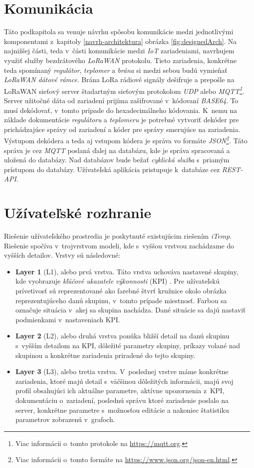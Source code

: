 \section{Komunikácia}\label{navrh-komunikacia}
Táto podkapitola sa venuje návrhu spôsobu komunikácie medzi jednotlivými komponentami z~kapitoly \ref{navrh-architektura} obrázka \ref{fig:designedArch}. Na najnižšej části, teda v~části komunikácie medzi \emph{IoT} zariadeniami, navrhujem využiť služby bezdrátového \emph{LoRaWAN} protokolu. 
Tieto zariadenia, konkrétne teda spomínaný \emph{regulátor}, \emph{teplomer} a \emph{brána} si medzi sebou budú vymieňať \emph{LoRaWAN dátové rámce}. Brána LoRa rádiové signály dešifruje a prepošle na LoRaWAN sieťový server štadartným sieťovým protokolom \emph{UDP} alebo \emph{MQTT\footnote{Viac informácii o~tomto protokole na \url{https://mqtt.org}.}}. 
Server užitočné dáta od zariadení prijíma zašifrované v~kódovaní \emph{BASE64}. 
To musí dekódovať, v~tomto prípade do hexadecimálneho kódovania. K~nemu na základe dokumentácie \emph{regulátoru} a \emph{teplomeru} je potrebné vytvoriť dekóder pre prichádzajúce správy od zariadení a kóder pre správy smerujúce na zariadenia. 
Výstupom dekódera a teda aj vstupom kódera je správa vo formáte \emph{JSON\footnote{Viac informácii o~tomto formáte na \url{https://www.json.org/json-en.html}.}.}
Táto správa je cez \emph{MQTT} poslaná ďalej na databázu, kde je správa spracovaná a uložená do databázy. 
Nad databázov bude bežať \emph{cyklická služba} s~priamým prístupom do databázy. Užívateľská aplikácia pristupuje k~databáze cez \emph{REST-API}.

\section{Užívateľské rozhranie}
Riešenie užívateľského prostredia je poskytnuté existujúcim riešením \emph{iTemp}.
Riešenie spočíva v~trojvrstvom modeli, kde s~vyššou vrstvou zachádzame do vyšších detailov. Vrstvy sú následovné:
\begin{itemize}
    \item \textbf{Layer 1} (L1), alebo prvá vrstva. Táto vrstva uchováva nastavené skupiny, kde vyobrazuje \textit{kľúčové ukazatele výkonnosti} (KPI) \cite{eckerson2010performance}. Pre užívateľskú prívetivosť sú reprezentované ako farebné štvrť kružnice okolo obrázka reprezentujúceho danú skupinu, v~tomto prípade miestnosť. Farbou sa označuje situácia v~akej sa skupina nachádza. Dané situácie sa dajú nastaviť podmienkami v~nastaveniach KPI.
    \item \textbf{Layer 2} (L2), alebo druhá vrstva ponúka bližší detail na danú skupinu s~vyšším detailom na KPI, dôležité parametry skupiny, príkazy volané nad skupinou a konkrétne zariadenia priradené do tejto skupiny.
    \item \textbf{Layer 3} (L3), alebo tretia vrstva. V~poslednej vrstve máme konkrétne zariadenia, ktoré majú detail s~väčšinou dôležitých informácii, majú svoj profil obsahujúci ich aktuálne parametre, aktívne upozornenia z~KPI, dokumentáciu o~zariadení, poslednú správu ktoré zariadenie poslalo na server, konkrétne parametre s~možnosťou editácie a nakoniec štatistiku parametrov zobrazenú v~grafoch.
\end{itemize}